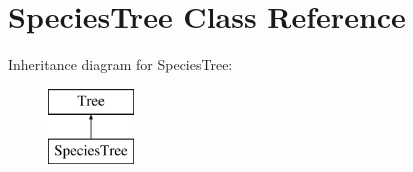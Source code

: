 \hypertarget{class_species_tree}{}\section{Species\+Tree Class Reference}
\label{class_species_tree}
Inheritance diagram for Species\+Tree\+:\begin{figure}[H]
\begin{center}
\leavevmode
\includegraphics[height=2.000000cm]{class_species_tree}
\end{center}
\end{figure}

